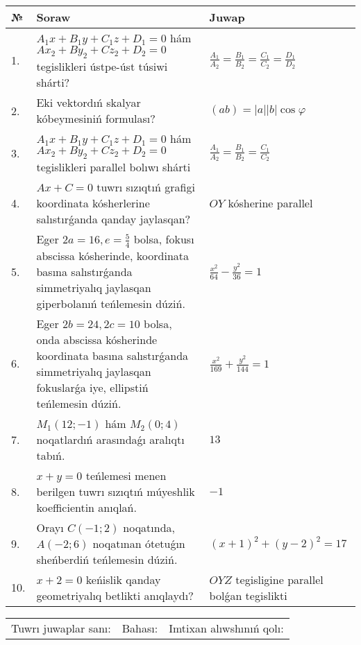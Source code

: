 \documentclass{article}
\begin{document}
\begin{tabular}{|m{0.7cm}|m{10cm}|m{4cm}|}
\hline
№ & Soraw & Juwap \\
\hline
1. & $A_1x+B_1y+C_1z+D_1=0$ hám $Ax_2+By_2+Cz_2+D_2=0$ tegislikleri ústpe-úst túsiwi shárti? & $\frac{A_1}{A_2}=\frac{B_1}{B_2}=\frac{C_1}{C_2}=\frac{D_1}{D_2}$ \\
\hline
2. & Eki vektordıń skalyar kóbeymesiniń formulası? & $(ab)=|a||b|\cos\varphi$ \\
\hline
3. & $A_1x+B_1y+C_1z+D_1=0$ hám $Ax_2+By_2+Cz_2+D_2=0$ tegislikleri parallel bolıwı shárti & $\frac{A_1}{A_2}=\frac{B_1}{B_2}=\frac{C_1}{C_2}$ \\
\hline
4. & $Ax+C=0$ tuwrı sızıqtıń grafigi koordinata kósherlerine salıstırǵanda qanday jaylasqan? & $OY$ kósherine parallel \\
\hline
5. & Eger $2a=16, e=\frac{5}{4}$ bolsa, fokusı abscissa kósherinde, koordinata basına salıstırǵanda simmetriyalıq jaylasqan giperbolanıń teńlemesin dúziń. & $\frac{x^{2}}{64}-\frac{y^{2}}{36}=1$ \\
\hline
6. & Eger $2b=24, 2 c=10$ bolsa, onda abscissa kósherinde koordinata basına salıstırǵanda simmetriyalıq jaylasqan fokuslarǵa iye, ellipstiń teńlemesin dúziń. & $\frac{x^{2}}{169}+\frac{y^{2}}{144}=1$ \\
\hline
7. & $M_{1} (12;-1)$ hám $M_{2} (0;4)$ noqatlardıń arasındaǵı aralıqtı tabıń. & $13$ \\
\hline
8. & $x+y=0$ teńlemesi menen berilgen tuwrı sızıqtıń múyeshlik koefficientin anıqlań. & $- 1$ \\
\hline
9. & Orayı $C (-1;2)$ noqatında, $A (-2;6 )$ noqatınan ótetuǵın sheńberdiń teńlemesin dúziń. & $(x+1)^{2}+(y-2)^{2}=17$ \\
\hline
10. & $x+2=0$ keńislik qanday geometriyalıq betlikti anıqlaydı? &  $OYZ$ tegisligine parallel bolǵan tegislikti \\
\hline
\end{tabular}

\vspace{1cm}

\begin{tabular}{lll}
Tuwrı juwaplar sanı: \underline{\hspace{1.5cm}} & 
Bahası: \underline{\hspace{1.5cm}} & 
Imtixan alıwshınıń qolı: \underline{\hspace{2cm}} \\
\end{tabular}
\end{document}
